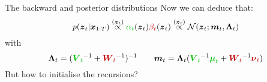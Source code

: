 \documentclass{beamer}
\newcommand{\MN}{{\mathcal N}}
\newcommand{\bs}[1]{\boldsymbol{#1}}
\newcommand{\paint}[2]{{\color{#1}#2}}
\begin{document}
\begin{frame}{The backward and posterior distributions}
Now we can deduce that:
\begin{equation*}
 p(\bs{z}_t|\bs{x}_{1:T}) \stackrel{(\bs{z}_t)}{\propto} \paint{mygreen}{\alpha_t}(\bs{z}_t)\paint{myred}{\beta_t}(\bs{z}_t) \stackrel{(\bs{z}_t)}{\propto} \MN(\bs{z}_t;\bs{m}_t,\bs{\Lambda}_{t})
\end{equation*}
with
\begin{equation*}
 \bs{\Lambda}_{t} = (\paint{mygreen}{\bs{V}_t}^{-1}+\paint{myred}{\bs{W}_t}^{-1})^{-1} \qquad \bs{m}_t = \bs{\Lambda}_{t}(\paint{mygreen}{\bs{V}_t}^{-1}\paint{mygreen}{\boldsymbol{\mu}_t} + \paint{myred}{\bs{W}_t}^{-1}\paint{myred}{\boldsymbol{\nu}_t})
\end{equation*}\pause
But how to initialise the recursions?
\end{frame}

\end{document}
